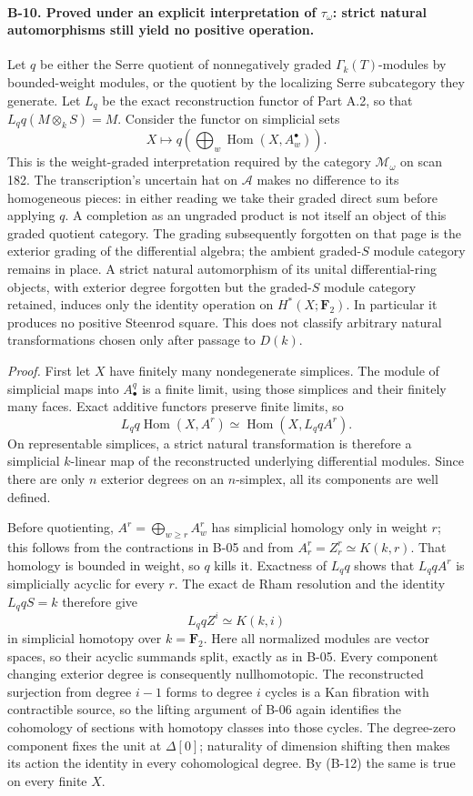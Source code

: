 \paragraph{B-10. Proved under an explicit interpretation of
$\tau_\omega$: strict natural automorphisms still yield no positive
operation.}
Let $q$ be either the Serre quotient of nonnegatively graded
$\Gamma_k(T)$-modules by bounded-weight modules, or the quotient by
the localizing Serre subcategory they generate. Let
$L_q$ be the exact reconstruction functor of Part A.2, so that
$L_q q(M\otimes_k S)=M$. Consider the functor on simplicial sets
\[
 X\longmapsto q\left(\bigoplus_w
           \operatorname{Hom}(X,A_w^\bullet)\right).
 \tag{B-11}
\]
This is the weight-graded interpretation required by the category
$\mathcal M_\omega$ on scan 182. The transcription's uncertain hat
on $\mathcal A$ makes no difference to its homogeneous pieces:
in either reading we take their graded direct sum before applying
$q$. A completion as an ungraded product is not itself an object
of this graded quotient category. The grading subsequently
forgotten on that page is the exterior grading of the differential
algebra; the ambient graded-$S$ module category remains in place.
A strict natural automorphism of its unital differential-ring
objects, with exterior degree forgotten but the graded-$S$ module
category retained, induces only the identity operation on
$H^*(X;\mathbf F_2)$. In particular it produces no positive
Steenrod square. This does not classify arbitrary natural
transformations chosen only after passage to $D(k)$.

\emph{Proof.}
First let $X$ have finitely many nondegenerate simplices.
The module of simplicial maps into $A_\bullet^q$ is a finite
limit, using those simplices and their finitely many faces.
Exact additive functors preserve finite limits, so
\[
 L_q q\operatorname{Hom}(X,A^r)
       \simeq \operatorname{Hom}(X,L_q qA^r).
 \tag{B-12}
\]
On representable simplices, a strict natural transformation is
therefore a simplicial $k$-linear map of the reconstructed
underlying differential modules. Since there are only $n$ exterior
degrees on an $n$-simplex, all its components are well defined.

Before quotienting, $A^r=\bigoplus_{w\geq r}A_w^r$ has simplicial
homology only in weight $r$; this follows from the contractions in
B-05 and from $A_r^r=Z_r^r\simeq K(k,r)$. That homology is bounded
in weight, so $q$ kills it. Exactness of $L_q q$ shows that
$L_q qA^r$ is simplicially acyclic for every $r$.
The exact de Rham resolution and the identity $L_q qS=k$
therefore give
\[
 L_q qZ^i\simeq K(k,i)
\]
in simplicial homotopy over $k=\mathbf F_2$. Here all normalized
modules are vector spaces, so their acyclic summands split, exactly
as in B-05. Every component changing exterior degree is consequently
nullhomotopic. The reconstructed surjection from degree $i-1$
forms to degree $i$ cycles is a Kan fibration with contractible
source, so the lifting argument of B-06 again identifies the
cohomology of sections with homotopy classes into those cycles.
The degree-zero component fixes the unit at
$\Delta[0]$; naturality of dimension shifting then makes its action
the identity in every cohomological degree. By (B-12) the same is
true on every finite $X$.

